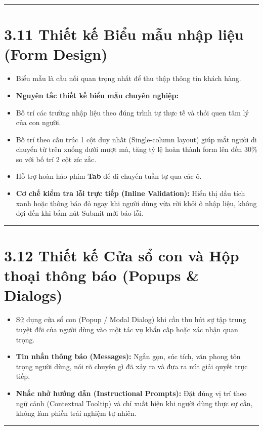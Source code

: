 \documentclass[11pt,a4paper,oneside]{report}
\begin{document}
\bigskip\hrule\bigskip

\section{3.11 Thiết kế Biểu mẫu nhập liệu (Form Design)}

\begin{itemize}[leftmargin=1.5em]
\item Biểu mẫu là cầu nối quan trọng nhất để thu thập thông tin khách hàng.
\item \textbf{Nguyên tắc thiết kế biểu mẫu chuyên nghiệp:}
\item Bố trí các trường nhập liệu theo đúng trình tự thực tế và thói quen tâm lý của con người.
\item Bố trí theo cấu trúc 1 cột duy nhất (Single-column layout) giúp mắt người di chuyển từ trên xuống dưới mượt mà, tăng tỷ lệ hoàn thành form lên đến 30\% so với bố trí 2 cột zíc zắc.
\item Hỗ trợ hoàn hảo phím \textbf{Tab} để di chuyển tuần tự qua các ô.
\item \textbf{Cơ chế kiểm tra lỗi trực tiếp (Inline Validation):} Hiển thị dấu tích xanh hoặc thông báo đỏ ngay khi người dùng vừa rời khỏi ô nhập liệu, không đợi đến khi bấm nút Submit mới báo lỗi.
\end{itemize}

\bigskip\hrule\bigskip

\section{3.12 Thiết kế Cửa sổ con và Hộp thoại thông báo (Popups \& Dialogs)}

\begin{itemize}[leftmargin=1.5em]
\item Sử dụng cửa sổ con (Popup / Modal Dialog) khi cần thu hút sự tập trung tuyệt đối của người dùng vào một tác vụ khẩn cấp hoặc xác nhận quan trọng.
\item \textbf{Tin nhắn thông báo (Messages):} Ngắn gọn, súc tích, văn phong tôn trọng người dùng, nói rõ chuyện gì đã xảy ra và đưa ra nút giải quyết trực tiếp.
\item \textbf{Nhắc nhở hướng dẫn (Instructional Prompts):} Đặt đúng vị trí theo ngữ cảnh (Contextual Tooltip) và chỉ xuất hiện khi người dùng thực sự cần, không làm phiền trải nghiệm tự nhiên.
\end{itemize}

\bigskip\hrule\bigskip
\end{document}
